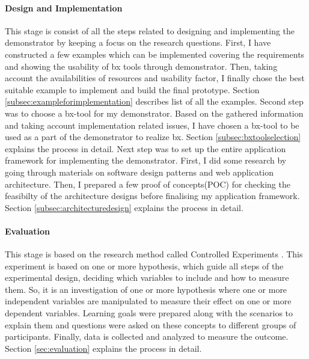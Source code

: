 \paragraph{Design and Implementation}
This stage is consist of all the steps related to designing and implementing the demonstrator by keeping a focus on the research questions.
\newline\newline First, I have constructed a few examples which can be implemented covering the requirements and showing the usability of bx tools through demonstrator. Then, taking account the availabilities of resources and usability factor, I finally chose the best suitable example to implement and build the final prototype. Section \ref{subsec:exampleforimplementation} describes list of all the examples.
\newline\newline Second step was to choose a bx-tool for my demonstrator. Based on the gathered information and taking account implementation related issues, I have chosen a bx-tool to be used as a part of the demonstrator to realize bx. Section \ref{subsec:bxtoolselection} explains the process in detail.
\newline\newline Next step was to set up the entire application framework for implementing the demonstrator. First, I did some research by going through materials on software design patterns and web application architecture. Then, I prepared a few proof of concepts(POC) for checking the feasibilty of the architecture designs before finalising my application framework. Section \ref{subsec:architecturedesign} explains the process in detail.

\paragraph{Evaluation} 
This stage is based on the research method called Controlled Experiments \cite{semethods}. This experiment is based on one or more hypothesis, which guide all steps of the experimental design, deciding which variables to include and how to measure them. So, it is an investigation of one or more hypothesis where one or more independent variables are manipulated to measure their effect on one or more dependent variables. Learning goals were prepared along with the scenarios to explain them and questions were asked on these concepts to different groups of participants. Finally, data is collected and analyzed to measure the outcome. Section \ref{sec:evaluation} explains the process in detail.

